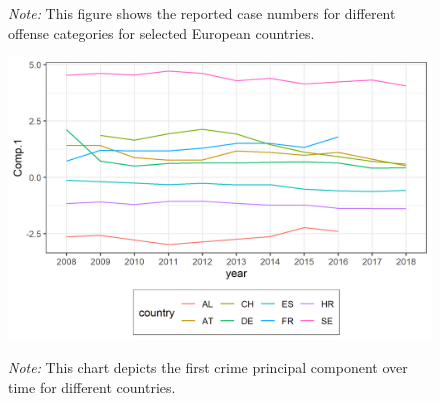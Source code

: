 \documentclass[a4paper,12pt]{article}
\begin{document}
\begin{figure}[!h]
\begin{flushleft}
\footnotesize{\textit{Note:} This figure shows the reported case numbers for different offense categories for selected European countries.
\label{fig:crime_case_data}	
}
\end{flushleft}
\end{figure}


\begin{figure}[!h]
\begin{minipage}{0.9\textwidth}
  \includegraphics[trim={0 0 0 0},width=\linewidth]{charts/princial_component_1.png}
\begin{flushleft}
\footnotesize{\textit{Note:} This chart depicts the first crime principal component over time for different countries. 
\label{fig:princial_component_1}	
}
\end{flushleft}
\end{minipage}
\end{figure}
\end{document}
